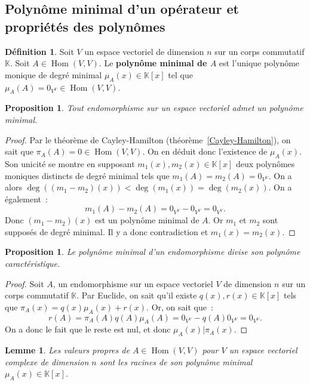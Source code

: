 \documentclass{article}
\DeclareMathOperator{\Hom}{Hom}
\newcommand{\K}{\mathbb K}
\newtheorem{prp}[thm]{Proposition}
\newtheorem{lem}[thm]{Lemme}
\theoremstyle{definition}
\newtheorem{déf}[thm]{Définition}
\theoremstyle{remark}
\begin{document}
	\subsection{Polynôme minimal d'un opérateur et propriétés des polynômes}
		\begin{déf} Soit $V$ un espace vectoriel de dimension $n$ sur un corps commutatif $\K$. Soit $A \in \Hom(V, V)$. Le \textbf{polynôme minimal de $A$}
		est l'unique polynôme monique de degré minimal $\mu_A(x) \in \K[x]$ tel que $\mu_A(A) = 0_{V^V} \in \Hom(V, V)$. \end{déf}

		\begin{prp} Tout endomorphisme sur un espace vectoriel admet un polynôme minimal. \end{prp}

		\begin{proof} Par le théorème de Cayley-Hamilton (théorème~\ref{Cayley-Hamilton}), on sait que $\pi_A(A) = 0 \in \Hom(V, V)$. On en déduit donc l'existence
		de $\mu_A(x)$. Son unicité se montre en supposant $m_1(x), m_2(x) \in \K[x]$ deux polynômes moniques distincts de degré minimal tels que
		$m_1(A) = m_2(A) = 0_{V^V}$. On a alors $\deg((m_1-m_2)(x)) < \deg(m_1(x)) = \deg(m_2(x))$. On a également~:
		\[m_1(A) - m_2(A) = 0_{V^V} - 0_{V^V} = 0_{V^V}.\]
		Donc $(m_1-m_2)(x)$ est un polynôme minimal de $A$. Or $m_1$ et $m_2$ sont supposés de degré minimal. Il y a donc contradiction et $m_1(x) = m_2(x)$.
		\end{proof}

		\begin{prp} Le polynôme minimal d'un endomorphisme divise son polynôme caractéristique. \end{prp}

		\begin{proof} Soit $A$, un endomorphisme sur un espace vectoriel $V$ de dimension $n$ sur un corps commutatif $\K$. Par Euclide, on sait qu'il existe
		$q(x), r(x) \in \K[x]$ tels que $\pi_A(x) = q(x)\mu_A(x) + r(x)$. Or, on sait que~:
		\[r(A) = \pi_A(A) q(A)\mu_A(A) = 0_{V^V} - q(A)0_{V^V} = 0_{V^V}.\]
		On a donc le fait que le reste est nul, et donc $\mu_A(x) | \pi_A(x)$. \end{proof}

		\begin{lem}\label{valPropreRacineMu} Les valeurs propres de $A \in \Hom(V, V)$ pour $V$ un espace vectoriel complexe de dimension $n$ sont les racines
		de son polynôme minimal $\mu_A(x) \in \K[x]$. \end{lem}
\end{document}
